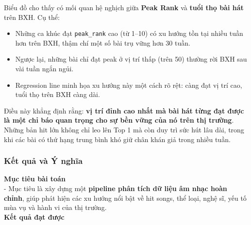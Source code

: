 \begin{enumerate}[label=\arabic*]
    Biểu đồ cho thấy có mối quan hệ nghịch giữa \textbf{Peak Rank} và \textbf{tuổi thọ bài hát} trên BXH.  
    Cụ thể:  
    \begin{itemize}
        \item Những ca khúc đạt \texttt{peak\_rank} cao (từ 1–10) có xu hướng tồn tại nhiều tuần hơn trên BXH, thậm chí một số bài trụ vững hơn 30 tuần.  
        \item Ngược lại, những bài chỉ đạt peak ở vị trí thấp (trên 50) thường rời BXH sau vài tuần ngắn ngủi.  
        \item Regression line minh họa xu hướng này một cách rõ rệt: càng đạt vị trí cao, tuổi thọ trên BXH càng dài.  
    \end{itemize}
    
    Điều này khẳng định rằng: \textbf{vị trí đỉnh cao nhất mà bài hát từng đạt được là một chỉ báo quan trọng cho sự bền vững của nó trên thị trường}. 
    Những bản hit lớn không chỉ leo lên Top 1 mà còn duy trì sức hút lâu dài, 
    trong khi các bài có thứ hạng trung bình khó giữ chân khán giả trong nhiều tuần.

\end{enumerate}

\subsubsection{Kết quả và Ý nghĩa}

    \textbf{Mục tiêu bài toán} \\
    
    - Mục tiêu là xây dựng một \textbf{pipeline phân tích dữ liệu âm nhạc hoàn chỉnh}, giúp phát hiện các xu hướng nổi bật về hit songs, thể loại, nghệ sĩ, yếu tố mùa vụ và hành vi của thị trường. \\
    
    \textbf{Kết quả đạt được} \\
    
